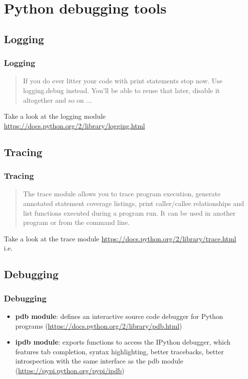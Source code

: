 \section{Python debugging tools}

\subsection{Logging}
\begin{frame}
\frametitle{Logging}	
\begin{quote}
	{\Large If you do ever litter your code with print statements stop now. Use logging.debug instead. You'll be able to reuse that later, disable it altogether and so on ...}
\end{quote}
Take a look at the logging module \url{https://docs.python.org/2/library/logging.html}
\end{frame}

\subsection{Tracing}
\begin{frame}
\frametitle{Tracing}	
\begin{quote}
The trace module allows you to trace program execution, generate annotated statement coverage listings, print caller/callee relationships and list functions executed during a program run. It can be used in another program or from the command line.
\end{quote}
Take a look at the trace module \url{https://docs.python.org/2/library/trace.html}\\
i.e.\\

\end{frame}

\subsection{Debugging}
\begin{frame}
\frametitle{Debugging}	
\begin{itemize}
 \item  \textbf{pdb module}: defines an interactive source code debugger for Python programs (\url{https://docs.python.org/2/library/pdb.html})
 \item \textbf{ipdb module}: exports functions to access the IPython debugger, which features tab completion, syntax highlighting, better tracebacks, better introspection with the same interface as the pdb module (\url{https://pypi.python.org/pypi/ipdb})
 \end{itemize} 
\end{frame}





